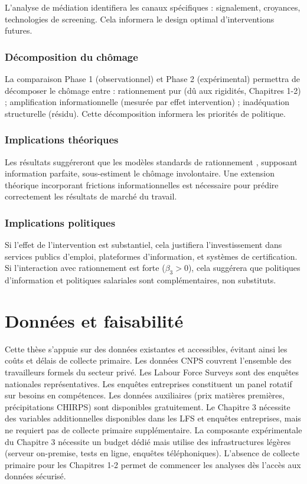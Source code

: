 \documentclass[12pt,a4paper]{article}
\begin{document}
L'analyse de médiation identifiera les canaux spécifiques : signalement, croyances, technologies de screening. Cela informera le design optimal d'interventions futures.

\subsubsection{Décomposition du chômage}

La comparaison Phase 1 (observationnel) et Phase 2 (expérimental) permettra de décomposer le chômage entre : rationnement pur (dû aux rigidités, Chapitres 1-2) ; amplification informationnelle (mesurée par effet intervention) ; inadéquation structurelle (résidu). Cette décomposition informera les priorités de politique.

\subsubsection{Implications théoriques}

Les résultats suggéreront que les modèles standards de rationnement \citep{kaur2019, breza2021}, supposant information parfaite, sous-estiment le chômage involontaire. Une extension théorique incorporant frictions informationnelles est nécessaire pour prédire correctement les résultats de marché du travail.

\subsubsection{Implications politiques}

Si l'effet de l'intervention est substantiel, cela justifiera l'investissement dans services publics d'emploi, plateformes d'information, et systèmes de certification. Si l'interaction avec rationnement est forte ($\beta_3 > 0$), cela suggérera que politiques d'information et politiques salariales sont complémentaires, non substituts.

\section{Données et faisabilité}

Cette thèse s'appuie sur des données existantes et accessibles, évitant ainsi les coûts et délais de collecte primaire. Les données CNPS couvrent l'ensemble des travailleurs formels du secteur privé. Les Labour Force Surveys sont des enquêtes nationales représentatives. Les enquêtes entreprises constituent un panel rotatif sur besoins en compétences. Les données auxiliaires (prix matières premières, précipitations CHIRPS) sont disponibles gratuitement. Le Chapitre 3 nécessite des variables additionnelles disponibles dans les LFS et enquêtes entreprises, mais ne requiert pas de collecte primaire supplémentaire. La composante expérimentale du Chapitre 3 nécessite un budget dédié mais utilise des infrastructures légères (serveur on-premise, tests en ligne, enquêtes téléphoniques). L'absence de collecte primaire pour les Chapitres 1-2 permet de commencer les analyses dès l'accès aux données sécurisé.
\end{document}
